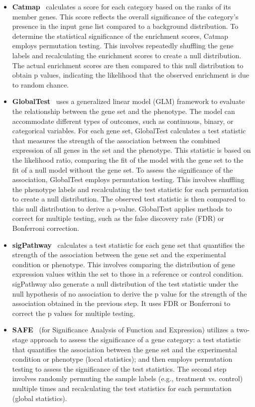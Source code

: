 \begin{itemize}
\item \textbf{Catmap}~\cite{Breslin:2004} calculates a score for each category based on the ranks of its member genes. This score reflects the overall significance of the category's presence in the input gene list compared to a background distribution. To determine the statistical significance of the enrichment scores, Catmap employs permutation testing. This involves repeatedly shuffling the gene labels and recalculating the enrichment scores to create a null distribution. The actual enrichment scores are then compared to this null distribution to obtain p values, indicating the likelihood that the observed enrichment is due to random chance.

\item \textbf{GlobalTest}~\cite{Goeman:2004} uses a generalized linear model (GLM) framework to evaluate the relationship between the gene set and the phenotype. The model can accommodate different types of outcomes, such as continuous, binary, or categorical variables. For each gene set, GlobalTest calculates a test statistic that measures the strength of the association between the combined expression of all genes in the set and the phenotype. This statistic is based on the likelihood ratio, comparing the fit of the model with the gene set to the fit of a null model without the gene set. To assess the significance of the association, GlobalTest employs permutation testing. This involves shuffling the phenotype labels and recalculating the test statistic for each permutation to create a null distribution. The observed test statistic is then compared to this null distribution to derive a p-value. GlobalTest applies methods to correct for multiple testing, such as the false discovery rate (FDR) or Bonferroni correction.

\item \textbf{sigPathway}~\cite{Tian:2005} calculates a test statistic for each gene set that quantifies the strength of the association between the gene set and the experimental condition or phenotype. This involves comparing the distribution of gene expression values within the set to those in a reference or control condition. sigPathway also generate a null distribution of the test statistic under the null hypothesis of no association to derive the p value for the strength of the association obtained in the previous step. It uses FDR or Bonferroni to correct the p values for multiple testing.

\item \textbf{SAFE}~\cite{Barry:2005} (for Significance Analysis of Function and Expression)  utilizes a two-stage approach to assess the significance of a gene category: a test statistic that quantifies the association between the gene set and the experimental condition or phenotype (local statistics); and then employs permutation testing to assess the significance of the test statistics. The second step involves randomly permuting the sample labels (e.g., treatment vs. control) multiple times and recalculating the test statistics for each permutation (global statistics).


\end{itemize}
